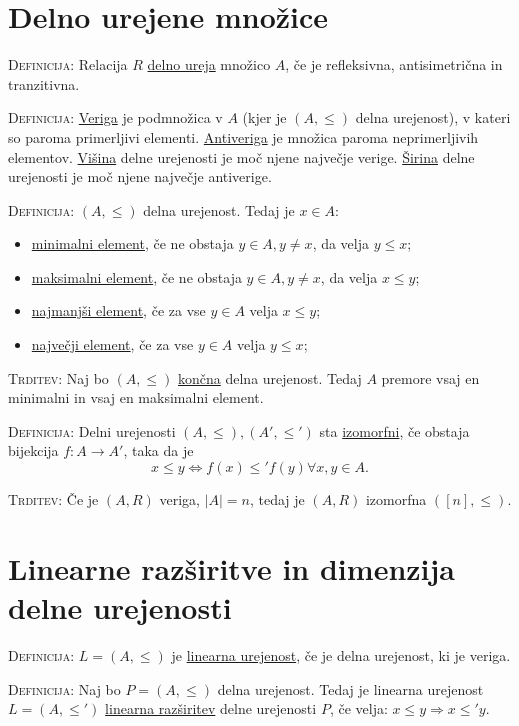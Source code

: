 \documentclass[8pt,a4paper]{amsart}
\theoremstyle{definition} %
\theoremstyle{plain} %
\begin{document}
\thispagestyle{empty}
\setlength{\parindent}{0pt}
\section{Delno urejene množice}

\textsc{Definicija:} Relacija $R$ \underline{delno ureja} množico $A$, če je refleksivna, antisimetrična in tranzitivna.

\textsc{Definicija:} \underline{Veriga} je podmnožica v $A$ (kjer je $(A, \leq)$ delna urejenost), v kateri so paroma primerljivi elementi. \underline{Antiveriga} je množica paroma neprimerljivih elementov. \underline{Višina} delne urejenosti je moč njene največje verige. \underline{Širina} delne urejenosti je moč njene največje antiverige.

\textsc{Definicija:} $(A, \leq)$ delna urejenost. Tedaj je $x \in A$:
 \begin{itemize}
 \item \underline{minimalni element}, če ne obstaja $y \in A, y \neq x$, da velja $y \leq x$;
 \item \underline{maksimalni element},  če ne obstaja $y \in A, y \neq x$, da velja $x \leq y$;
 \item \underline{najmanjši element}, če za vse $y \in A$ velja $x \leq y$;
 \item \underline{največji element}, če za vse $y \in A$ velja $y \leq x$;
 \end{itemize}

 \textsc{Trditev:} Naj bo $(A, \leq)$ \underline{končna} delna urejenost. Tedaj $A$ premore vsaj en minimalni in vsaj en maksimalni element.

 \textsc{Definicija:} Delni urejenosti $(A,\leq),(A',\leq')$ sta \underline{izomorfni}, če obstaja bijekcija $f:A \longrightarrow A'$, taka da je
 $$
 x\leq y \Longleftrightarrow f(x) \leq' f(y) \forall x,y \in A.
 $$

 \textsc{Trditev:} Če je $(A,R)$ veriga, $|A|=n$, tedaj je $(A,R)$ izomorfna $([n],\leq)$.

 \section{Linearne razširitve in dimenzija delne urejenosti}

 \textsc{Definicija:} $L=(A,\leq)$ je \underline{linearna urejenost}, če je delna urejenost, ki je veriga.

 \textsc{Definicija:} Naj bo $P=(A,\leq)$ delna urejenost. Tedaj je linearna urejenost $L=(A,\leq')$ \underline{linearna razširitev} delne urejenosti $P$, če velja: $x\leq y \Longrightarrow x \leq' y$.
\end{document}
